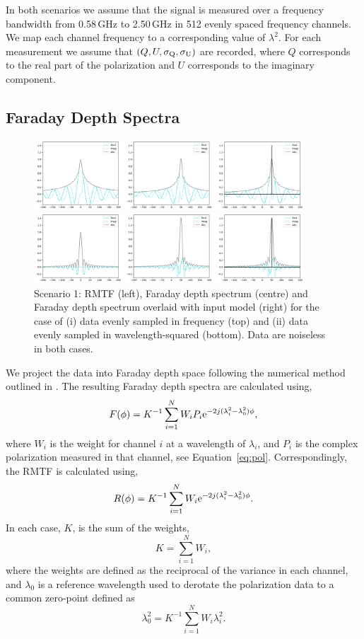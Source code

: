 \documentclass[fleqn,usenatbib]{mnras}
\begin{document}
In both scenarios we assume that the signal is measured over a frequency bandwidth from 0.58\,GHz to 2.50\,GHz in 512 evenly spaced frequency channels. We map each channel frequency to a corresponding value of $\lambda^2$. For each measurement we assume that $(Q, U, \sigma_{\rm Q}, \sigma_{\rm U})$ are recorded, where $Q$ corresponds to the real part of the polarization and $U$ corresponds to the imaginary component.

\subsection{Faraday Depth Spectra}
\label{sec:fdspectra}

%
\begin{figure}
\centerline{\includegraphics[width=0.9\textwidth]{./FIGURES/Scenario1_fsamp.png}}
\centerline{\includegraphics[width=0.9\textwidth]{./FIGURES/Scenario1_lsamp.png}}
\caption{\label{fig:scen1samp} Scenario 1: RMTF (left), Faraday depth spectrum (centre) and Faraday depth spectrum overlaid with input model (right) for the case of (i) data evenly sampled in frequency (top) and (ii) data evenly sampled in wavelength-squared (bottom). Data are noiseless in both cases.}
\end{figure}
%
We project the data into Faraday depth space following the numerical method outlined in \cite{2005A&A...441.1217B}. The resulting Faraday depth spectra are calculated using,
%
\begin{equation}
F(\phi) = K^{-1}\sum_{i = 1}^{N}{W_i P_i {\rm e}^{-2j (\lambda_i^2 - \lambda_0^2) \phi}},
\end{equation}
%
where $W_i$ is the weight for channel $i$ at a wavelength of $\lambda_i$, and $P_i$ is the complex polarization measured in that channel, see Equation~\ref{eq:pol}. Correspondingly, the RMTF is calculated using,
%
\begin{equation}
R(\phi) = K^{-1}\sum_{i = 1}^{N}{W_i {\rm e}^{-2j (\lambda_i^2 - \lambda_0^2) \phi}}.
\end{equation}
%
In each case, $K$, is the sum of the weights,
%
\begin{equation}
K = \sum_{i = 1}^{N}{W_i},
\end{equation}
%
where the weights are defined as the reciprocal of the variance in each channel, and $\lambda_0$ is a reference wavelength used to derotate the polarization data to a common zero-point defined as
%
\begin{equation}
\lambda_0^2 = K^{-1}\sum_{i = 1}^{N}{W_i \lambda_i^2}.
\end{equation}
\end{document}
